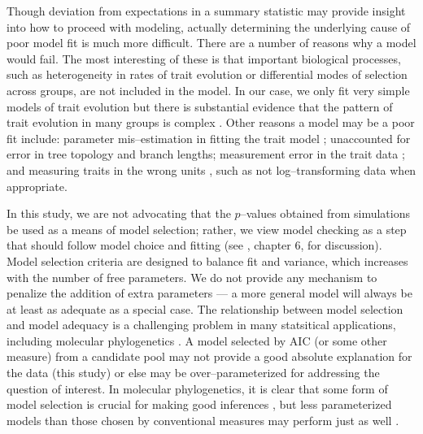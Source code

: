 \documentclass[a4paper,12pt]{article}
\begin{document}
Though deviation from expectations in a summary statistic may provide insight into how to proceed with modeling, actually determining the underlying cause of poor model fit is much more difficult. There are a number of reasons why a model would fail. The most interesting of these is that important biological processes, such as heterogeneity in rates of trait evolution or differential modes of selection across groups, are not included in the model. In our case, we only fit very simple models of trait evolution but there is substantial evidence that the pattern of trait evolution in many groups is complex \citep{Foote1997, PennellPE}. Other reasons a model may be a poor fit include: parameter mis--estimation in fitting the trait model \citep{Ane2008, HoAne2012}; unaccounted for error in tree topology and branch lengths; measurement error in the trait data \citep{HarmonLosos2005, Hansen2012}; and measuring traits in the wrong units \citep{Houle2011}, such as not log--transforming data when appropriate. 

In this study, we are not advocating that the $p$--values obtained from simulations be used as a means of model selection; rather, we view model checking as a step that should follow model choice and fitting (see \citep{Gelmanbook}, chapter 6, for discussion). Model selection criteria are designed to balance fit and variance, which increases with the number of free parameters. We do not provide any mechanism to penalize the addition of extra parameters --- a more general model will always be at least as adequate as a special case. The relationship between model selection and model adequacy is a challenging problem in many statsitical applications, including molecular phylogenetics \citep{Ripplinger2010, Evans2011, Lewis2013}. A model selected by AIC (or some other measure) from a candidate pool may not provide a good absolute explanation for the data (this study) or else may be over--parameterized for addressing the question of interest. In molecular phylogenetics, it is clear that some form of model selection is crucial for making good inferences  \citep{SullivanSwofford, Ripplinger2008}, but less parameterized models than those chosen by conventional measures may perform just as well \citep{Ripplinger2010}.
\end{document}

